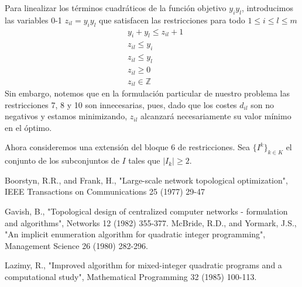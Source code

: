 \documentclass[twoside,12pt]{article}
\begin{document}
\newpage
Para linealizar los términos cuadráticos de la función objetivo $y_iy_l$, introducimos las variables 0-1 $z_{il} = y_iy_l$ que satisfacen las restricciones para todo $1\leq i \leq l \leq m$
\begin{align}
&y_i+y_l\leq z_{il}+1\\
&z_{il} \leq y_i\\
&z_{il}\leq y_l\\
&z_{il}\geq 0\\
&z_{il}\in \mathbb{Z}
\end{align}
Sin embargo, notemos que en la formulación particular de nuestro problema las restricciones 7, 8 y 10 son innecesarias, pues, dado que los costes $d_{il}$ son no negativos y estamos minimizando, $z_{il}$ alcanzará necesariamente su valor mínimo en el óptimo. 

Ahora consideremos una extensión del bloque 6 de restricciones. Sea $\{I^k\}_{k\in K}$ el conjunto de los subconjuntos de $I$ tales que $|I_k|\geq 2$.

\newpage
\begin{thebibliography}{9}
Boorstyn, R.R., and Frank, H., "Large-scale network
topological optimization", IEEE Transactions on Communications
25 (1977) 29-47

Gavish, B., "Topological design of centralized computer
networks - formulation and algorithms", Networks 12
(1982) 355-377. 
McBride, R.D., and Yormark, J.S., "An implicit enumeration algorithm for quadratic integer programming", Management Science 26 (1980) 282-296.

Lazimy, R., "Improved algorithm for mixed-integer quadratic programs and a computational study", Mathematical Programming 32 (1985) 100-113.
\end{thebibliography} 
\end{document}
